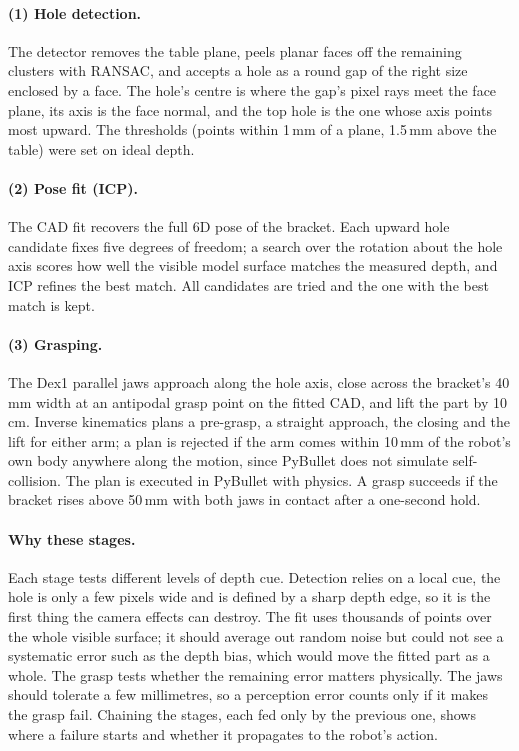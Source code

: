 \documentclass[10pt,a4paper]{article}
\begin{document}
\paragraph{(1) Hole detection.} The detector removes the table plane, peels planar faces off the remaining
clusters with RANSAC, and accepts a hole as a round gap of the right size enclosed by a face. The hole's centre
is where the gap's pixel rays meet the face plane, its axis is the face normal, and the top hole is the one
whose axis points most upward. The thresholds (points within 1\,mm of a plane, 1.5\,mm above the table) were
set on ideal depth.

\paragraph{(2) Pose fit (ICP).} The CAD fit recovers the full 6D pose of the bracket. Each upward hole candidate
fixes five degrees of freedom; a search over the rotation about the hole axis scores how well the visible model
surface matches the measured depth, and ICP refines the best match. All candidates are tried and the one with
the best match is kept.

\paragraph{(3) Grasping.} The Dex1 parallel jaws approach along the hole axis, close across the bracket's 40\,mm
width at an antipodal grasp point on the fitted CAD, and lift the part by 10\,cm. Inverse kinematics plans a
pre-grasp, a straight approach, the closing and the lift for either arm; a plan is rejected if the arm comes
within 10\,mm of the robot's own body anywhere along the motion, since PyBullet does not simulate
self-collision. The plan is executed in PyBullet with physics. A grasp succeeds if the bracket rises above 50\,mm with both jaws in contact after a one-second
hold.


\paragraph{Why these stages.} Each stage tests different levels of depth cue. Detection relies on a local
cue, the hole is only a few pixels wide and is defined by a sharp depth edge, so it is the first thing the
camera effects can destroy. The fit uses thousands of points over the whole visible surface; it should average out
random noise but could not see a systematic error such as the depth bias, which would move the fitted part as a whole.
The grasp tests whether the remaining error matters physically. The jaws should tolerate a few millimetres, so a
perception error counts only if it makes the grasp fail. Chaining the stages, each fed only by the previous
one, shows where a failure starts and whether it propagates to the robot's action.
\end{document}
